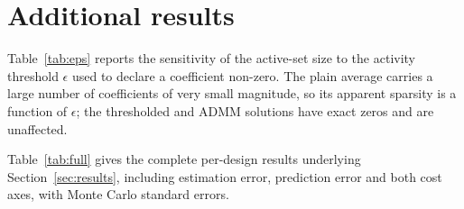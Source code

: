 \section{Additional results}
\label{app:extra}

Table~\ref{tab:eps} reports the sensitivity of the active-set size to the
activity threshold $\epsilon$ used to declare a coefficient non-zero. The
plain average carries a large number of coefficients of very small
magnitude, so its apparent sparsity is a function of $\epsilon$; the
thresholded and ADMM solutions have exact zeros and are unaffected.



Table~\ref{tab:full} gives the complete per-design results underlying
Section~\ref{sec:results}, including estimation error, prediction error and
both cost axes, with Monte Carlo standard errors.


